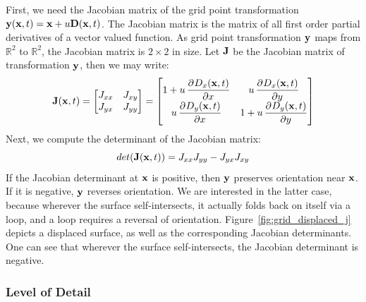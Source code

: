 %
First, we need the Jacobian matrix of the grid point transformation 
$\mathbf{y}(\mathbf{x},t)=\mathbf{x}+u\mathbf{D}(\mathbf{x},t)$. The Jacobian matrix is 
the matrix of all first order partial derivatives of a vector valued function. 
As grid point transformation $\mathbf{y}$ maps from $\mathbb{R}^2$ to 
$\mathbb{R}^2$, the Jacobian matrix is $2\times 2$ in size. Let $\mathbf{J}$ be 
the Jacobian matrix of transformation $\mathbf{y}$, then we may write:
%
\begin{equation}
 \mvec{J}(\mvec{x},t) =
 \begin{bmatrix}
 J_{xx} & J_{xy} \\
 J_{yx} & J_{yy}
 \end{bmatrix}
 =
 \begin{bmatrix}
   1 + u\dpd{D_x(\mvec{x},t)}{x} & u\dpd{D_x(\mvec{x},t)}{y} \\
   u\dpd{D_y(\mvec{x},t)}{x} & 1 + u\dpd{D_y(\mvec{x},t)}{y}
 \end{bmatrix}
\end{equation}
Next, we compute the determinant of the Jacobian matrix:
\begin{equation}
 det(\mathbf{J}(\mathbf{x},t)) = J_{xx}J_{yy}-J_{yx}J_{xy}
\end{equation}
%
If the Jacobian determinant at $\mathbf{x}$ is positive, then $\mathbf{y}$ 
preserves orientation near $\mathbf{x}$. If it is negative, $\mathbf{y}$ reverses 
orientation. We are interested in the latter case, because wherever the 
surface self-intersects, it actually folds back on itself via a loop, and a 
loop requires a reversal of orientation. Figure~\ref{fig:grid_displaced_j} 
depicts a displaced surface, as well as the corresponding Jacobian 
determinants. One can see that wherever the surface self-intersects, the 
Jacobian determinant is negative.


\subsubsection{Level of Detail}

